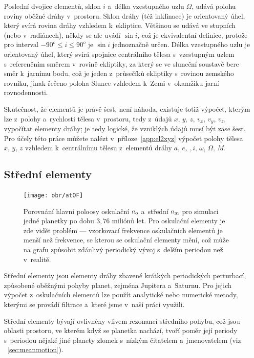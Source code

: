 \documentclass[A4paper, 12pt, oneside]{book}
\begin{document}
Poslední dvojice elementů, sklon $i$ a~délka vzestupného uzlu $\Omega$, udává polohu roviny oběžné dráhy v~prostoru. Sklon dráhy (též inklinace) je orientovaný úhel, který svírá rovina dráhy vzhledem k~ekliptice. Většinou se udává ve stupních (nebo v~radiánech), někdy se ale uvádí $\sin i$, což je ekvivalentní definice, protože pro interval $-90^o\leq i \leq 90^o$ je $\sin i$ jednoznačně určen. Délka vzestupného uzlu je orientovaný úhel, který svírá spojnice centrálního tělesa s~vzestupným uzlem s~referenčním směrem v~rovině ekliptiky, za který se ve sluneční soustavě bere směr k~jarnímu bodu, což je jeden z~průsečíků ekliptiky s~rovinou zemského rovníku, jinak řečeno poloha Slunce vzhledem k~Zemi v~okamžiku jarní rovnodennosti.

Skutečnost, že elementů je právě šest, není náhoda, existuje totiž výpočet, kterým lze z~polohy a~rychlosti tělesa v~prostoru, tedy z~údajů $x,\, y,\, z,\, v_x,\, v_y,\, v_z$, vypočítat elementy dráhy; je tedy logické, že vzniklých údajů musí být zase šest. Pro účely této práce můžete nalézt v~příloze~\ref{app:el2xyz} výpočet polohy tělesa $x,\,y,\,z$ vzhledem k~centrálnímu tělesu z~elementů dráhy $a,\,e,~,i,\,\omega,\,\Omega,\,M$.

\subsection{Střední elementy}

\begin{figure}
	\centering
	\texttt{[image: obr/atOF]}
	\caption{Porovnání hlavní poloosy oskulační $a_{\rm o}$ a~střední $a_{\rm m}$ pro simulaci jedné planetky po dobu $3,76$ miliónů let. Pro oskulační elementy je zde vidět problém  --- vzorkovací frekvence oskulačních elementů je menší než frekvence, se kterou se oskulační elementy mění, což může na grafu způsobit zdánlivý periodický vývoj s~delším periodou než v~realitě.} 
	\label{atOF}
\end{figure}

Střední elementy jsou elementy dráhy zbavené krátkých periodických perturbací, způsobené oběžnými pohyby planet, zejména Jupitera a~Saturnu. Pro jejich výpočet z~oskulačních elementů lze použít analytické nebo numerické metody, kterými se provádí filtrace a~které jsme v~naší práci využili. 

Střední elementy bývají ovlivněny vlivem rezonancí středního pohybu, což jsou oblasti prostoru, ve kterém když se planetka nachází, tvoří poměr její periody s~periodou nějaké jiné planety zlomek s~nízkým čitatelem a~jmenovatelem (viz ~\ref{sec:meanmotion}). 
\end{document}
